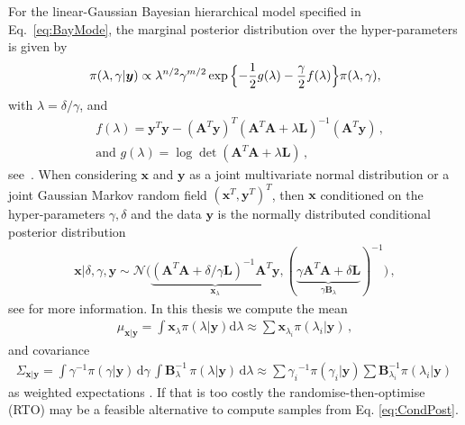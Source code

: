 For the linear-Gaussian Bayesian hierarchical model specified in Eq.~\ref{eq:BayMode}, the marginal posterior distribution over the hyper-parameters is given by
\begin{align}
	\pi(\lambda, \gamma | \bm{y})
	\propto  \lambda^{n/2} \gamma^{m/2}   \exp{ \Bigl\{ - \frac{1}{2} g ( \lambda) - \frac{\gamma}{2} f ( \lambda) \Bigr\} } \pi(\lambda, \gamma),
	\label{eq:MargPostAppl}
\end{align}
with $\lambda = \delta / \gamma$, and
\begin{subequations}
	\label{eq:fandg}
	\begin{align}
		&f ( \lambda) = \bm{y}^T \bm{y} - (\bm{A}^T \bm{y})^T (\bm{A}^T  \bm{A} + \lambda \bm{L})^{-1} (\bm{A}^T \bm{y})  \, ,  \\
		&\text{and } g(\lambda) = \log \det (\bm{A}^T  \bm{A} + \lambda \bm{L}) \, ,
	\end{align}
\end{subequations}
see~\cite[Lemma 2]{fox2016fast}.
When considering $\bm{x}$ and $\bm{y}$ as a joint multivariate normal distribution or a joint Gaussian Markov random field $(\bm{x}^T,\bm{y}^T)^T$, then $\bm{x}$ conditioned on the hyper-parameters $\gamma, \delta$ and the data $\bm{y}$ is the normally distributed conditional posterior distribution
\begin{align}
	\bm{x}| \delta, \gamma, \bm{y}  \sim \mathcal{N}\big( \underbrace{ (\bm{A}^T \bm{A} + \delta / \gamma \bm{L} )^{-1} \bm{A}^T \bm{y}}_{\bm{x}_{\lambda}}, ( \underbrace{ \gamma \bm{A}^T \bm{A} + \delta \bm{L} }_{\gamma \bm{B}_{\lambda}}  )^{-1} \big) \, \label{eq:CondPost},
\end{align}
see \cite{SIMPSON201216, rue2005gaussian, fox2016fast} for more information.
In this thesis we compute the mean
\begin{align}
	\mu_{\bm{x}|\bm{y}} = \int \bm{x}_{\lambda} \pi(\lambda| \bm{y}) \text{d}\lambda \approx \sum \bm{x}_{\lambda_i} \pi(\lambda_i| \bm{y}) \, , \label{eq:MeanInt}
\end{align} and covariance
\begin{align}
	\Sigma_{\bm{x}|\bm{y}} = \int \gamma^{-1}  \pi(\gamma | \bm{y} ) \, \text{d} \gamma \, \int  \bm{B}_{\lambda}^{-1} \, \pi(\lambda | \bm{y} )  \, \text{d} \lambda  \approx \sum {\gamma_i}^{-1}\pi(\gamma_i| \bm{y}) \sum \bm{B}_{\lambda_i}^{-1}\pi(\lambda_i| \bm{y})\, \label{eq:CovInt}
\end{align}
as weighted expectations \cite{}.
If that is too costly the randomise-then-optimise (RTO) \cite{bardsley2015randomize, fox2016fast} may be a feasible alternative to compute samples from Eq. \ref{eq:CondPost}.

